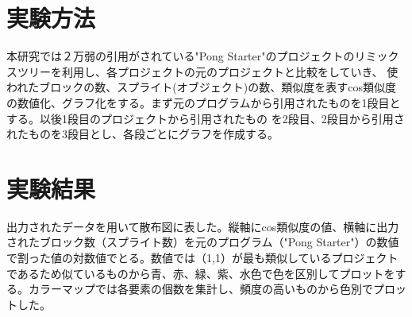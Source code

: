 \documentclass[twocolumn,9pt,a4paper]{jsarticle}
\begin{document}
\section{実験方法}
本研究では２万弱の引用がされている"Pong Starter"のプロジェクトのリミックスツリーを利用し、各プロジェクトの元のプロジェクトと比較をしていき、 使われたブロックの数、スプライト(オブジェクト)の数、類似度を表すcos類似度の数値化、グラフ化をする。まず元のプログラムから引用されたものを1段目とする。以後1段目のプロジェクトから引用されたもの を2段目、2段目から引用されたものを3段目とし、各段ごとにグラフを作成する。
\section{実験結果}
出力されたデータを用いて散布図に表した。縦軸にcos類似度の値、横軸に出力されたブロック数（スプライト数）を元のプログラム（"Pong Starter"）の数値で割った値の対数値でとる。数値では（1,1）が最も類似しているプロジェクトであるため似ているものから青、赤、緑、紫、水色で色を区別してプロットをする。カラーマップでは各要素の個数を集計し、頻度の高いものから色別でプロットした。
\\
\end{document}

